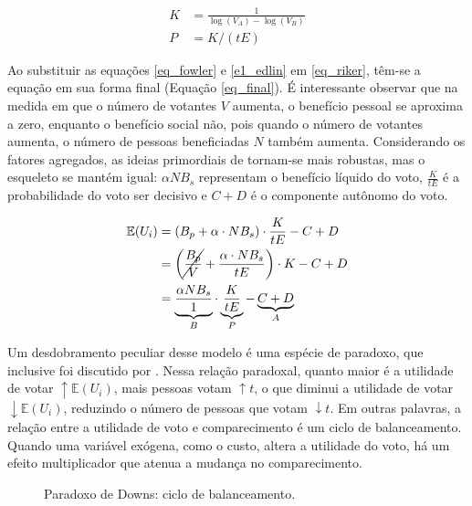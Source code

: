 \begin{equation}
\label{e1_edlin}
\begin{aligned}
    K &= \frac{1}{\log(V_A)-\log(V_B)}\\
    P &= K/(tE)
\end{aligned}
\end{equation}

Ao substituir as equações \ref{eq_fowler} e \ref{e1_edlin} em \ref{eq_riker}, têm-se a equação em sua forma final (Equação \ref{eq_final}). É interessante observar que na medida em que o número de votantes $V$ aumenta, o benefício pessoal se aproxima a zero, enquanto o benefício social não, pois quando o número de votantes aumenta, o número de pessoas beneficiadas $N$ também aumenta. Considerando os fatores agregados, as ideias primordiais de \textcite{downs1957economic} tornam-se mais robustas, mas o esqueleto se mantém igual: $\alpha NB_s$ representam o benefício líquido do voto, $\frac{K}{tE}$ é a probabilidade do voto ser decisivo e $C+D$ é o componente autônomo do voto.

\begin{equation}
\label{eq_final}
\begin{aligned}
    \mathbb{E}(U_i)&=(B_p + \alpha\cdot NB_s)\cdot \frac{K}{tE}-C+D\\
    &=\left(\cancel{\frac{B_p}{V}} + \frac{\alpha\cdot NB_s}{tE}\right)\cdot K-C+D\\
    &=\underbrace{\frac{\alpha NB_s}{1}}_B\cdot\underbrace{\frac{K}{tE}}_P-\underbrace{C+D}_A
\end{aligned}
\end{equation}

Um desdobramento peculiar desse modelo é uma espécie de paradoxo, que inclusive foi discutido por \textcite{downs1957economic}. Nessa relação paradoxal, quanto maior é a utilidade de votar $\uparrow\mathbb{E}(U_i)$, mais pessoas votam $\uparrow t$, o que diminui a utilidade de votar $\downarrow\mathbb{E}(U_i)$, reduzindo o número de pessoas que votam $\downarrow t$. Em outras palavras, a relação entre a utilidade de voto e comparecimento é um ciclo de balanceamento. Quando uma variável exógena, como o custo, altera a utilidade do voto, há um efeito multiplicador que atenua a mudança no comparecimento. 

\begin{figure}
    \centering
    \caption{Paradoxo de Downs: ciclo de balanceamento.}

    
    \label{cycle}
\end{figure}

